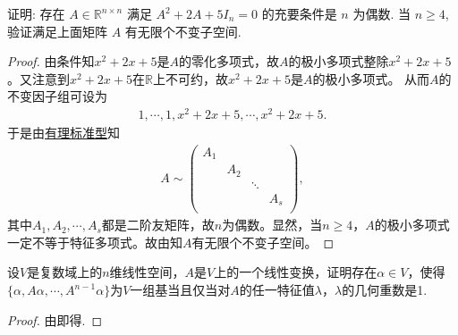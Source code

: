 \documentclass[../../main.tex]{subfiles}
\begin{document}
\begin{example}
证明: 存在 \( A \in \mathbb{R}^{n \times n} \) 满足 \( A^2 + 2A + 5I_n = 0 \) 的充要条件是 \( n \) 为偶数. 当 \( n \geqslant 4 \), 验证满足上面矩阵 \( A \) 有无限个不变子空间.
\end{example}
\begin{proof}
由条件知$x^2+2x+5$是$A$的零化多项式，故$A$的极小多项式整除$x^2+2x+5$。又注意到$x^2+2x+5$在$\mathbb{R}$上不可约，故$x^2+2x+5$是$A$的极小多项式。
从而$A$的不变因子组可设为
\begin{align*}
1,\cdots ,1,x^2+2x+5,\cdots ,x^2+2x+5.
\end{align*}
于是由\hyperref[theorem:有理标准型核心定理]{有理标准型}知
\begin{align*}
A\sim \begin{pmatrix}
A_1&		&		&		\\
&		A_2&		&		\\
&		&		\ddots&		\\
&		&		&		A_s\\
\end{pmatrix},
\end{align*}
其中$A_1,A_2,\cdots ,A_s$都是二阶友矩阵，故$n$为偶数。显然，当$n\geqslant 4$，$A$的极小多项式一定不等于特征多项式。故由知$A$有无限个不变子空间。

\end{proof}

\begin{example}
设\( V \)是复数域上的\( n \)维线性空间，\( A \)是\( V \)上的一个线性变换，证明存在\( \alpha \in V \)，使得\( \{ \alpha, A\alpha, \cdots, A^{n-1}\alpha \} \)为\( V \)一组基当且仅当对\( A \)的任一特征值\( \lambda \)，\( \lambda \)的几何重数是1.
\end{example}
\begin{proof}
由即得.

\end{proof}
\end{document}
